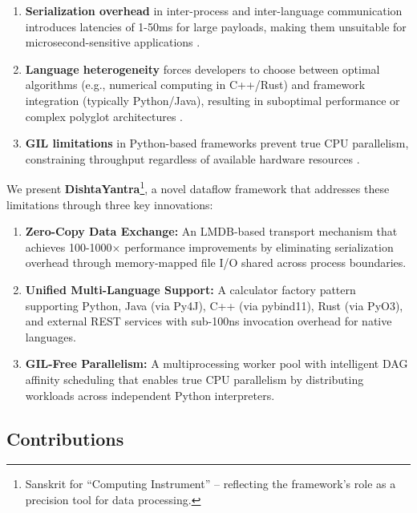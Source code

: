 \documentclass[11pt,a4paper]{article}
\begin{document}
\begin{enumerate}
    \item \textbf{Serialization overhead} in inter-process and inter-language communication introduces latencies of 1-50ms for large payloads, making them unsuitable for microsecond-sensitive applications \cite{murray2013naiad}.
    
    \item \textbf{Language heterogeneity} forces developers to choose between optimal algorithms (e.g., numerical computing in C++/Rust) and framework integration (typically Python/Java), resulting in suboptimal performance or complex polyglot architectures \cite{kleppmann2017designing}.
    
    \item \textbf{GIL limitations} in Python-based frameworks prevent true CPU parallelism, constraining throughput regardless of available hardware resources \cite{beazley2010gil}.
\end{enumerate}

We present \textbf{DishtaYantra}\footnote{Sanskrit for ``Computing Instrument'' -- reflecting the framework's role as a precision tool for data processing.}, a novel dataflow framework that addresses these limitations through three key innovations:

\begin{enumerate}
    \item \textbf{Zero-Copy Data Exchange:} An LMDB-based transport mechanism that achieves 100-1000$\times$ performance improvements by eliminating serialization overhead through memory-mapped file I/O shared across process boundaries.
    
    \item \textbf{Unified Multi-Language Support:} A calculator factory pattern supporting Python, Java (via Py4J), C++ (via pybind11), Rust (via PyO3), and external REST services with sub-100ns invocation overhead for native languages.
    
    \item \textbf{GIL-Free Parallelism:} A multiprocessing worker pool with intelligent DAG affinity scheduling that enables true CPU parallelism by distributing workloads across independent Python interpreters.
\end{enumerate}

\subsection{Contributions}
\end{document}
